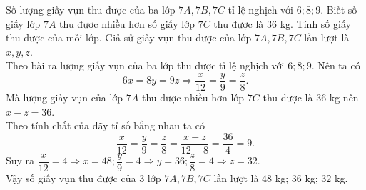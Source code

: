		\begin{ex}%
			Số lượng giấy vụn thu được của ba lớp $7A, 7B, 7C$ tỉ lệ nghịch với $6; 8; 9$. Biết số giấy lớp $7A$ thu được nhiều hơn số giấy lớp $7C$ thu được là $36$ kg. Tính số giấy thu được của mỗi lớp.
			\loigiai
		{
		Giả sử giấy vụn thu được của lớp $7A, 7B, 7C$ lần lượt là $x, y, z$.\\
		Theo bài ra lượng giấy vụn của ba lớp thu được tỉ lệ nghịch với $6; 8; 9$. Nên ta có $$6x= 8y= 9z \Rightarrow \dfrac{x}{12}= \dfrac{y}{9}= \dfrac{z}{8}.$$
		Mà lượng giấy vụn của lớp $7A$ thu được nhiều hơn lớp $7C$ thu được là $36$ kg nên $x- z= 36$.\\
		Theo tính chất của dãy tỉ số bằng nhau ta có $$\dfrac{x}{12}= \dfrac{y}{9}= \dfrac{z}{8}= \dfrac{x-z}{12-8}= \dfrac{36}{4}= 9.$$	
		Suy ra $\dfrac{x}{12}= 4 \Rightarrow x= 48;
		\dfrac{y}{9}= 4 \Rightarrow y= 36; 
		\dfrac{z}{8}= 4 \Rightarrow z= 32.$\\
		Vậy số giấy vụn thu được của 3 lớp $7A, 7B, 7C$ lần lượt là $48$ kg; $36$ kg; $32$ kg.
			}
		\end{ex}
